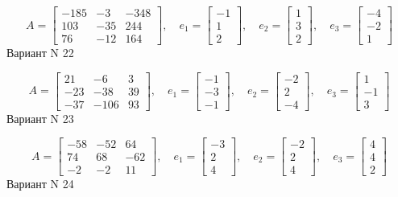 \documentclass[11pt]{report}
\begin{document}
$$A = \left[\begin{matrix}-185 & -3 & -348\\103 & -35 & 244\\76 & -12 & 164\end{matrix}\right],\quad e_1 = \left[\begin{matrix}-1\\1\\2\end{matrix}\right],\quad e_2 = \left[\begin{matrix}1\\3\\2\end{matrix}\right],\quad e_3 = \left[\begin{matrix}-4\\-2\\1\end{matrix}\right]$$Вариант N 22

$$A = \left[\begin{matrix}21 & -6 & 3\\-23 & -38 & 39\\-37 & -106 & 93\end{matrix}\right],\quad e_1 = \left[\begin{matrix}-1\\-3\\-1\end{matrix}\right],\quad e_2 = \left[\begin{matrix}-2\\2\\-4\end{matrix}\right],\quad e_3 = \left[\begin{matrix}1\\-1\\3\end{matrix}\right]$$Вариант N 23

$$A = \left[\begin{matrix}-58 & -52 & 64\\74 & 68 & -62\\-2 & -2 & 11\end{matrix}\right],\quad e_1 = \left[\begin{matrix}-3\\2\\4\end{matrix}\right],\quad e_2 = \left[\begin{matrix}-2\\2\\4\end{matrix}\right],\quad e_3 = \left[\begin{matrix}4\\4\\2\end{matrix}\right]$$Вариант N 24
\end{document}
